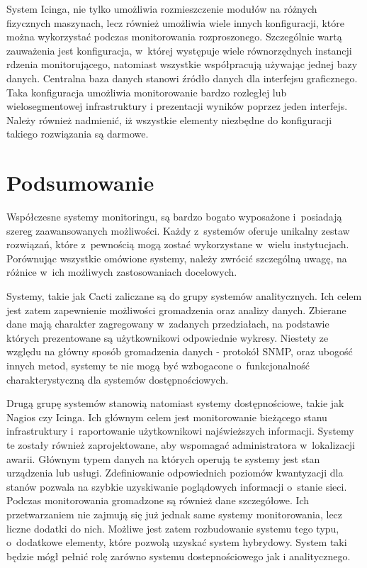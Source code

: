 System Icinga, nie tylko umożliwia rozmieszczenie modułów na różnych
fizycznych maszynach, lecz również umożliwia wiele innych
konfiguracji, które można wykorzystać podczas monitorowania
rozproszonego. Szczególnie wartą zauważenia jest konfiguracja,
w~której występuje wiele równorzędnych instancji rdzenia
monitorującego, natomiast wszystkie współpracują używając jednej bazy
danych. Centralna baza danych stanowi źródło danych dla interfejsu
graficznego. Taka konfiguracja umożliwia monitorowanie bardzo
rozległej lub wielosegmentowej infrastruktury i prezentacji wyników
poprzez jeden interfejs. Należy również nadmienić, iż wszystkie
elementy niezbędne do konfiguracji takiego rozwiązania są darmowe.

\section[Podsumowanie][Podsumowanie]{Podsumowanie}

Współczesne systemy monitoringu, są bardzo bogato wyposażone
i~posiadają szereg zaawansowanych możliwości. Każdy z~systemów oferuje
unikalny zestaw rozwiązań, które z~pewnością mogą zostać wykorzystane
w~wielu instytucjach. Porównując wszystkie omówione systemy, należy
zwrócić szczególną uwagę, na różnice w~ich możliwych zastosowaniach
docelowych.

Systemy, takie jak Cacti zaliczane są do grupy systemów
analitycznych. Ich celem jest zatem zapewnienie możliwości gromadzenia
oraz analizy danych. Zbierane dane mają charakter zagregowany
w~zadanych przedziałach, na podstawie których prezentowane są
użytkownikowi odpowiednie wykresy. Niestety ze względu na główny
sposób gromadzenia danych - protokół SNMP, oraz ubogość innych metod,
systemy te nie mogą być wzbogacone o~funkcjonalność charakterystyczną
dla systemów dostępnościowych.

Drugą grupę systemów stanowią natomiast systemy dostępnościowe, takie
jak Nagios czy Icinga. Ich głównym celem jest monitorowanie bieżącego
stanu infrastruktury i~raportowanie użytkownikowi najświeższych
informacji. Systemy te zostały również zaprojektowane, aby wspomagać
administratora w~lokalizacji awarii. Głównym typem danych na których
operują te systemy jest stan urządzenia lub usługi. Zdefiniowanie
odpowiednich poziomów kwantyzacji dla stanów pozwala na szybkie
uzyskiwanie poglądowych informacji o~stanie sieci. Podczas
monitorowania gromadzone są również dane szczegółowe. Ich
przetwarzaniem nie zajmują się już jednak same systemy monitorowania,
lecz liczne dodatki do nich. Możliwe jest zatem rozbudowanie systemu
tego typu, o~dodatkowe elementy, które pozwolą uzyskać system
hybrydowy. System taki będzie mógł pełnić rolę zarówno systemu
dostepnościowego jak i analitycznego.

